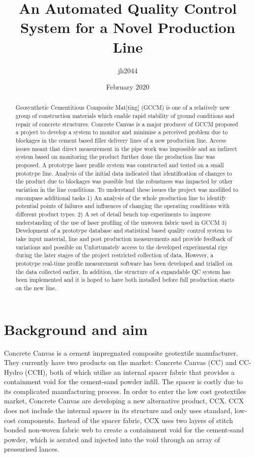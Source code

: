 \documentclass[12pt]{report}
\title{An Automated Quality Control System for a Novel Production Line}
\author{jh2044}
\date{February 2020}
\begin{document}
\maketitle

\begin{abstract}
Geosynthetic Cementitious Composite Mat[ting] (GCCM) is one of a relatively new group of construction materials which enable rapid stability of ground conditions and repair of concrete structures. Concrete Canvas is a major producer of GCCM proposed a project to develop a system to monitor and minimise a perceived problem due to blockages in the cement based filler delivery lines of a new production line. Access issues meant that direct measurement in the pipe work was impossible and an indirect system based on monitoring the product further done the production line was proposed. A prototype laser profile system was constructed and tested on a small prototype line. Analysis of the initial data indicated that identification of changes to the product due to blockages was possible but the robustness was impacted by other variation in the line conditions. To understand these issues the project was modified to encompass additional tasks  1) An analysis of the whole production line  to identify potential points of failures and influences of changing the operating conditions with different product types. 2) A set of detail bench top experiments to improve understanding of the use of laser profiling of the unwoven fabric used in GCCM 3) Development of a prototype database and statistical based quality control system to take input material, line and post production measurements and provide feedback of variations and possible on Unfortunately access to the developed experimental rigs during the later stages of the project restricted collection of data. However, a prototype real-time profile measurement software has been developed and trialled on the data collected earlier. In addition, the structure of a expandable QC system has been implemented and it is hoped to have both installed before full production starts on the new line.
    
    
\end{abstract}

\tableofcontents

\chapter{Background and aim}
    Concrete Canvas is a cement impregnated composite geotextile manufacturer. They currently have two products on the market: Concrete Canvas (CC) and CC-Hydro (CCH), both of which utilise an internal spacer fabric that provides a containment void for the cement-sand powder infill. The spacer is costly due to its complicated manufacturing process. In order to enter the low cost geotextiles market, Concrete Canvas are developing a new alternative product, CCX. CCX does not include the internal spacer in its structure and only uses standard, low-cost components. Instead of the spacer fabric, CCX uses two layers of stitch bonded non-woven fabric web to create a containment void for the cement-sand powder, which is aerated and injected into the void through an array of pressurised lances.
    
\end{document}
